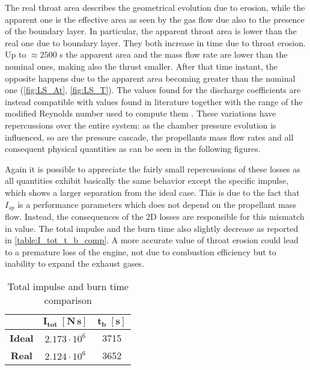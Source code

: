 
The real throat area describes the geometrical evolution due to erosion, while the apparent one is the effective area as seen by the gas flow due also to the presence of the boundary layer.
In particular, the apparent throat area is lower than the real one due to boundary layer. They both increase in time due to throat erosion. Up to $\approx 2500$ s the apparent area and the mass flow rate are lower than the nominal ones, making also the thrust smaller. After that time instant, the opposite happens due to the apparent area becoming greater than the nominal one (\autoref{fig:LS_At}, \autoref{fig:LS_T}).
The values found for the discharge coefficients are instead compatible with values found in literature together with the range of the modified Reynolds number used to compute them \cite{slides_maggi}.
These variations have repercussions over the entire system: as the chamber pressure evolution is influenced, so are the pressure cascade, the propellants mass flow rates and all consequent physical quantities as can be seen in the following figures.


Again it is possible to appreciate the fairly small repercussions of these losses as all quantities exhibit basically the same behavior except the specific impulse, which shows a larger separation from the ideal case.
This is due to the fact that $I_{sp}$ is a performance parameters which does not depend on the propellant mass flow. Instead, the consequences of the 2D losses are responsible for this mismatch in value.
The total impulse and the burn time also slightly decrease as reported in \autoref{table:I_tot_t_b_comp}. A more accurate value of throat erosion could lead to a premature loss of the engine, not due to combustion efficiency but to inability to expand the exhaust gases.

\begin{table}[H]
    \renewcommand{\arraystretch}{1.2}
    \centering
    \begin{tabular}{|c|c|c|}
        \hline
        & $\boldsymbol{I_{tot} \; [\textbf{N} \, \textbf{s}]}$ & $\boldsymbol{t_b \; [\textbf{s}]}$ \\
        \hline
        \hline
        \textbf{Ideal} & $2.173 \cdot 10^6$ & 3715 \\
        \hline
        \textbf{Real} & $2.124 \cdot 10^6$ & 3652 \\
        \hline
    \end{tabular}
    \caption{Total impulse and burn time comparison}
    \label{table:I_tot_t_b_comp}
\end{table}